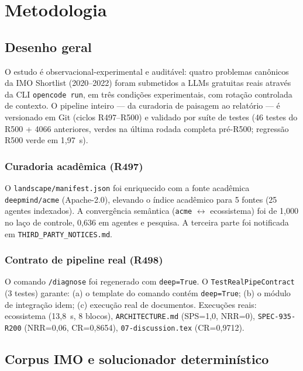 \chapter{Metodologia}

\section{Desenho geral}

O estudo é observacional-experimental e auditável: quatro problemas canônicos
da IMO Shortlist (2020--2022) foram submetidos a LLMs gratuitas reais através
da CLI \texttt{opencode run}, em três condições experimentais, com rotação
controlada de contexto. O pipeline inteiro — da curadoria de paisagem ao
relatório — é versionado em Git (ciclos R497--R500) e validado por suíte de
testes (46 testes do R500 + 4066 anteriores, verdes na última rodada completa
pré-R500; regressão R500 verde em 1,97~s).

\subsection*{Curadoria acadêmica (R497)}
O \texttt{landscape/manifest.json} foi enriquecido com a fonte acadêmica
\texttt{deepmind/acme} (Apache-2.0), elevando o índice acadêmico para 5 fontes
(25 agentes indexados). A convergência semântica (\texttt{acme} $\leftrightarrow$
ecossistema) foi de 1,000 no laço de controle, 0,636 em agentes e pesquisa. A
terceira parte foi notificada em \texttt{THIRD\_PARTY\_NOTICES.md}.

\subsection*{Contrato de pipeline real (R498)}
O comando \texttt{/diagnose} foi regenerado com \texttt{deep=True}. O
\texttt{TestRealPipeContract} (3 testes) garante: (a) o template do comando
contém \texttt{deep=True}; (b) o módulo de integração idem; (c) execução real
de documentos. Execuções reais: ecossistema (13,8~s, 8 blocos),
\texttt{ARCHITECTURE.md} (SPS=1,0, NRR=0), \texttt{SPEC-935-R200}
(NRR=0,06, CR=0,8654), \texttt{07-discussion.tex} (CR=0,9712).

\section{Corpus IMO e solucionador determinístico}

